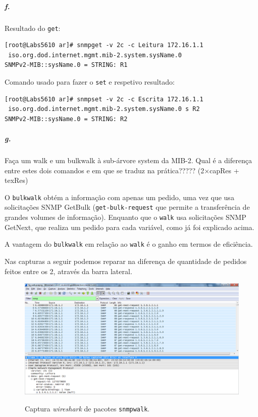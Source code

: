 \newpage

\subparagraph{f.}
Resultado do \texttt{get}:
\begin{verbatim}
[root@Labs5610 ar]# snmpget -v 2c -c Leitura 172.16.1.1
 iso.org.dod.internet.mgmt.mib-2.system.sysName.0
SNMPv2-MIB::sysName.0 = STRING: R1
\end{verbatim}

Comando usado para fazer o \texttt{set} e respetivo resultado:
\begin{verbatim}
[root@Labs5610 ar]# snmpset -v 2c -c Escrita 172.16.1.1
 iso.org.dod.internet.mgmt.mib-2.system.sysName.0 s R2
SNMPv2-MIB::sysName.0 = STRING: R2
\end{verbatim}


\subparagraph{g.}
Faça um walk e um bulkwalk à sub-árvore system da MIB-2. Qual é a diferença entre estes dois comandos e em que se traduz na prática????? (2×capRes + texRes)

O \texttt{bulkwalk} obtém a informação com apenas um pedido, uma vez que usa solicitações SNMP GetBulk (\texttt{get-bulk-request} que permite a transferência de grandes volumes de informação).
Enquanto que o \texttt{walk} usa solicitações SNMP GetNext, que realiza um pedido para cada variável, como já foi explicado acima.

A vantagem do \texttt{bulkwalk} em relação ao \texttt{walk} é o ganho em termos de eficiência.

Nas capturas a seguir podemos reparar na diferença de quantidade de pedidos  feitos entre os 2, através da barra lateral.


\begin{figure}[h]
\centering
\includegraphics[width=1\textwidth, height=0.35\textheight]{5g_walk.png}
\label{fig:8-capturaWireshark}
\caption{Captura \emph{wireshark} de pacotes \texttt{snmpwalk}.}
\end{figure}

